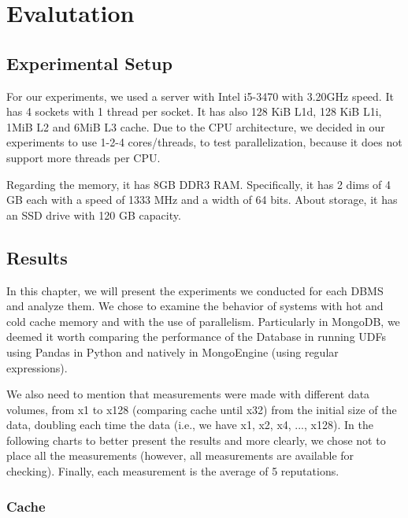 \section{Evalutation}
\label{sec:experiments}

\subsection{Experimental Setup}
For our experiments, we used a server with Intel i5-3470 with 3.20GHz speed. It has 4 sockets with 1 thread per socket. 
It has also 128 KiB L1d, 128 KiB L1i, 1MiB L2 and 6MiB L3 cache. Due to the CPU architecture, we decided in our experiments to use 1-2-4 cores/threads, 
to test parallelization, because it does not support more threads per CPU.

Regarding the memory, it has 8GB DDR3 RAM. Specifically, it has 2 dims of 4 GB each with a speed of 1333 MHz and a width of 64 bits. 
About storage, it has an SSD drive with 120 GB capacity.




\subsection{Results}

In this chapter, we will present the experiments we conducted for each DBMS and analyze them. 
We chose to examine the behavior of systems with hot and cold cache memory and with the use of parallelism. 
Particularly in MongoDB, we deemed it worth comparing the performance of the Database in running UDFs using 
Pandas in Python and natively in MongoEngine (using regular expressions).

We also need to mention that measurements were made with different data volumes, 
from x1 to x128 (comparing cache until x32) from the initial size of the data, doubling each time the data (i.e., we have x1, x2, x4, ..., x128). 
In the following charts to better present the results and more clearly, we chose not to place all the measurements 
(however, all measurements are available for checking). Finally, each measurement is the average of 5 reputations.

\subsubsection{Cache}

